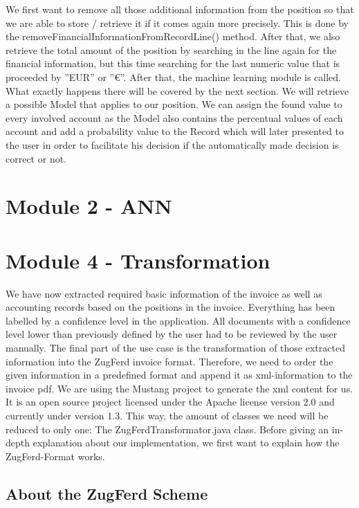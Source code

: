 We first want to remove all those additional information from the position so that we are able to store / retrieve it if it comes again more precisely. This is done by the removeFinancialInformationFromRecordLine() method. After that, we also retrieve the total amount of the position by searching in the line again for the financial information, but this time searching for the last numeric value that is proceeded by ''EUR'' or ''\euro''.
After that, the machine learning module is called. What exactly happens there will be covered by the next section. We will retrieve a possible Model that applies to our position. We can assign the found value to every involved account as the Model also contains the percentual values of each account and add a probability value to the Record which will later presented to the user in order to facilitate his decision if the automatically made decision is correct or not.


\section{Module 2 - ANN}

\section{Module 4 - Transformation}

We have now extracted required basic information of the invoice as well as accounting records based on the positions in the invoice. Everything has been labelled by a confidence level in the application. All documents with a confidence level lower than previously defined by the user had to be reviewed by the user manually.
The final part of the use case is the transformation of those extracted information into the ZugFerd invoice format. Therefore, we need to order the given information in a predefined format and append it as xml-information to the invoice pdf.
We are using the Mustang project to generate the xml content for us. It is an open source project licensed under the Apache license version 2.0 and currently under version 1.3. This way, the amount of classes we need will be reduced to only one: The ZugFerdTransformator.java class.
Before giving an in-depth explanation about our implementation, we first want to explain how the ZugFerd-Format works.

\subsection{About the ZugFerd Scheme}

